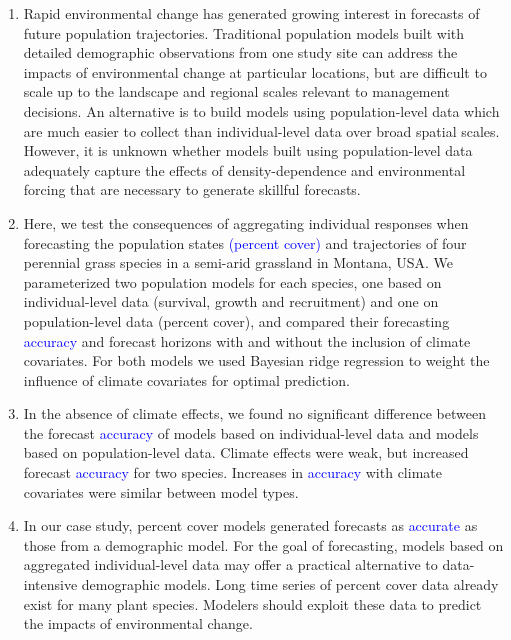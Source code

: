 \documentclass[12pt,]{article}
\begin{document}
\begin{enumerate}[label=\textbf{\arabic*}]
        \item Rapid environmental change has generated growing interest in forecasts of future population trajectories. Traditional population models built with detailed demographic observations from one study site can address the impacts of environmental change at particular locations, but are difficult to scale up to the landscape and regional scales relevant to management decisions. An alternative is to build models using population-level data which are much easier to collect than individual-level data over broad spatial scales. However, it is unknown whether models built using population-level data adequately capture the effects of density-dependence and environmental forcing that are necessary to generate skillful forecasts.
        \item Here, we test the consequences of aggregating individual responses when forecasting the population states \textcolor{blue}{(percent cover)} and trajectories of four perennial grass species in a semi-arid grassland in Montana, USA. We parameterized two population models for each species, one based on individual-level data (survival, growth and recruitment) and one on population-level data (percent cover), and compared their forecasting \textcolor{blue}{accuracy} and forecast horizons with and without the inclusion of climate covariates. For both models we used Bayesian ridge regression to weight the influence of climate covariates for optimal prediction. 
        \item In the absence of climate effects, we found no significant difference between the forecast \textcolor{blue}{accuracy} of models based on individual-level data and models based on population-level data. Climate effects were weak, but increased forecast \textcolor{blue}{accuracy} for two species. Increases in \textcolor{blue}{accuracy} with climate covariates were similar between model types.
        \item In our case study, percent cover models generated forecasts as \textcolor{blue}{accurate} as those from a demographic model. For the goal of forecasting, models based on aggregated individual-level data may offer a practical alternative to data-intensive demographic models. Long time series of percent cover data already exist for many plant species. Modelers should exploit these data to predict the impacts of environmental change.
    \end{enumerate}
\end{document}
